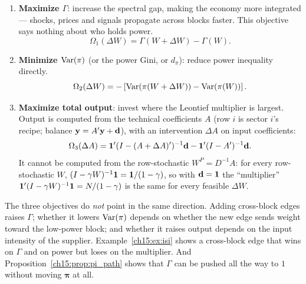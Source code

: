 \documentclass[../structural_economics_book.tex]{subfiles}
\begin{document}
\begin{enumerate}
\item \textbf{Maximize $\Gamma$}: increase the spectral gap, making the economy more integrated --- shocks, prices and signals propagate across blocks faster. This objective says nothing about who holds power.
\begin{equation}\label{ch15:eq:obj_gamma}
\Omega_1(\Delta W) = \Gamma(W + \Delta W) - \Gamma(W).
\end{equation}

\item \textbf{Minimize $\operatorname{Var}(\pi)$} (or the power Gini, or $d_\pi$): reduce power inequality directly.
\begin{equation}\label{ch15:eq:obj_var}
\Omega_2(\Delta W) = -\left[\operatorname{Var}(\pi(W + \Delta W)) - \operatorname{Var}(\pi(W))\right].
\end{equation}

\item \textbf{Maximize total output}: invest where the Leontief multiplier is largest. Output is computed from the technical coefficients $A$ (row $i$ is sector $i$'s recipe; balance $\mathbf{y} = A'\mathbf{y} + \mathbf{d}$), with an intervention $\Delta A$ on input coefficients:
\begin{equation}\label{ch15:eq:obj_output}
\Omega_3(\Delta A) = \mathbf{1}'(I - (A + \Delta A)')^{-1}\mathbf{d} - \mathbf{1}'(I - A')^{-1}\mathbf{d}.
\end{equation}
It cannot be computed from the row-stochastic $W^P = D^{-1}A$: for every row-stochastic $W$, $(I - \gamma W)^{-1}\mathbf{1} = \mathbf{1}/(1-\gamma)$, so with $\mathbf{d} = \mathbf{1}$ the ``multiplier'' $\mathbf{1}'(I - \gamma W)^{-1}\mathbf{1} = N/(1-\gamma)$ is the same for every feasible $\Delta W$.
\end{enumerate}

\begin{intuition}
The three objectives do \emph{not} point in the same direction. Adding cross-block edges raises $\Gamma$; whether it lowers $\operatorname{Var}(\pi)$ depends on whether the new edge sends weight toward the low-power block; and whether it raises output depends on the input intensity of the supplier. Example~\ref{ch15:ex:isi} shows a cross-block edge that wins on $\Gamma$ and on power but loses on the multiplier. And Proposition~\ref{ch15:prop:pi_path} shows that $\Gamma$ can be pushed all the way to $1$ without moving $\boldsymbol{\pi}$ at all.
\end{intuition}
\end{document}
